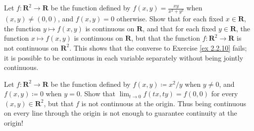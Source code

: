 \begin{exercise}\label{ex 2.2.11}
    Let \(f : \mathbf{R}^2 \to \mathbf{R}\) be the function defined by \(f(x, y) = \frac{xy}{x^2 + y^2}\) when \((x, y) \neq (0, 0)\), and \(f(x, y) = 0\) otherwise.
    Show that for each fixed \(x \in \mathbf{R}\), the function \(y \mapsto f(x, y)\) is continuous on \(\mathbf{R}\), and that for each fixed \(y \in \mathbf{R}\), the function \(x \mapsto f(x, y)\) is continuous on \(\mathbf{R}\), but that the function \(f : \mathbf{R}^2 \to \mathbf{R}\) is not continuous on \(\mathbf{R}^2\).
    This shows that the converse to Exercise \ref{ex 2.2.10} fails;
    it is possible to be continuous in each variable separately without being jointly continuous.
\end{exercise}

\begin{exercise}\label{ex 2.2.12}
    Let \(f: \mathbf{R}^2 \to \mathbf{R}\) be the function defined by \(f(x, y) \coloneqq x^2 / y\) when \(y \neq 0\), and \(f(x, y) \coloneqq 0\) when \(y = 0\).
    Show that \(\lim_{t \to 0} f(tx, ty) = f(0, 0)\) for every \((x, y) \in \mathbf{R}^2\), but that \(f\) is not continuous at the origin.
    Thus being continuous on every line through the origin is not enough to guarantee continuity at the origin!
\end{exercise}